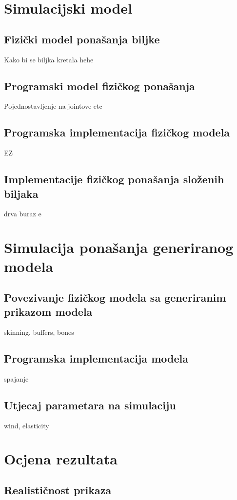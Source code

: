 \documentclass[times, utf8, diplomski]{fer}
\begin{document}
\chapter{Simulacijski model}
\section{Fizički model ponašanja biljke}
Kako bi se biljka kretala hehe

\section{Programski model fizičkog ponašanja}
Pojednostavljenje na jointove etc

\section{Programska implementacija fizičkog modela}
EZ

\section{Implementacije fizičkog ponašanja složenih biljaka}
drva buraz e

\chapter{Simulacija ponašanja generiranog modela}
\section{Povezivanje fizičkog modela sa generiranim prikazom modela}
skinning, buffers, bones

\section{Programska implementacija modela}
spajanje

\section{Utjecaj parametara na simulaciju}
wind, elasticity

\chapter{Ocjena rezultata}
\section{Realističnost prikaza}
\end{document}
